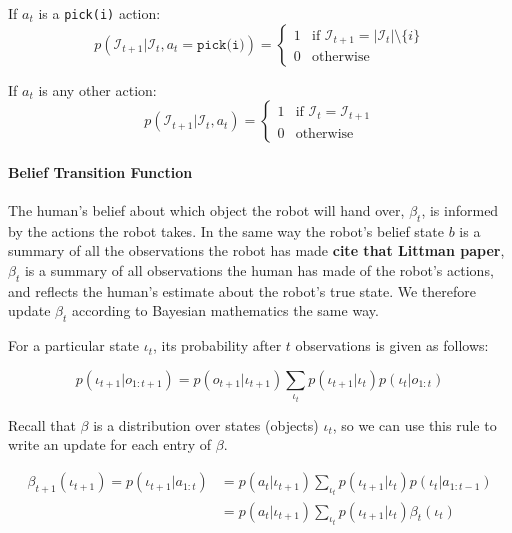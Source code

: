 \documentclass{article}
\newcommand{\Iota}{\mathcal{I}}
\begin{document}
If $a_t$ is a \texttt{pick(i)} action: 
\begin{equation}
	p(\Iota_{t+1} | \Iota_t, a_t = \texttt{pick(i)}) = \begin{cases}
		1 & \text{if $\Iota_{t+1} = |\Iota_t| \setminus \{i\}$} \\ 
		0 & \text{otherwise}
	\end{cases}
\end{equation}


If $a_t$ is any other action: 
\begin{equation}
	p(\Iota_{t+1} | \Iota_t, a_t) = \begin{cases}
		1 & \text{if $\Iota_{t} = \Iota_{t+1}$} \\ 
		0 & \text{otherwise}
	\end{cases}
\end{equation}

\paragraph{Belief Transition Function}

The human's belief about which object the robot will hand over, $\beta_t$, is informed by the actions the robot takes. In the same way the robot's belief state $b$ is a summary of all the observations the robot has made \textbf{cite that Littman paper}, $\beta_t$ is a summary of all observations the human has made of the robot's actions, and reflects the human's estimate about the robot's true state. We therefore update $\beta_t$ according to Bayesian mathematics the same way. 

For a particular state $\iota_t$, its probability after $t$ observations is given as follows: 

\begin{equation}
	p(\iota_{t+1} | o_{1:t+1}) = p(o_{t+1} | \iota_{t+1}) \sum_{\iota_{t}} p(\iota_{t+1} | \iota_{t}) p (\iota_{t} | o_{1:t})
\end{equation}

Recall that $\beta$ is a distribution over states (objects) $\iota_t$, so we can use this rule to write an update for each entry of $\beta$. 

\begin{align*}
	\beta_{t+1}(\iota_{t+1}) = p(\iota_{t+1} | a_{1:t}) &= p(a_{t} | \iota_{t+1}) \sum_{\iota_{t}} p(\iota_{t+1} | \iota_{t}) p (\iota_{t} | a_{1:t-1}) \\ 
	&= p(a_{t} | \iota_{t+1}) \sum_{\iota_{t}} p(\iota_{t+1} | \iota_{t}) \beta_{t}(\iota_{t}) 
\end{align*}
\end{document}

